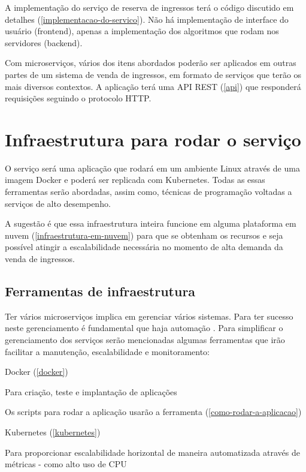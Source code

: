 A implementação do serviço de reserva de ingressos terá o código discutido
em detalhes (\autoref{implementacao-do-servico}). Não há implementação
de interface do usuário (frontend), apenas a implementação dos algoritmos
que rodam nos servidores (backend).

Com microserviços, vários dos itens abordados poderão ser aplicados em outras partes
de um sistema
de venda de ingressos, em formato de serviços que terão os mais diversos contextos.
A aplicação terá uma API REST (\autoref{api}) que responderá requisições
seguindo o protocolo HTTP.

\section{Infraestrutura para rodar o serviço}

O serviço será uma aplicação que rodará em um ambiente Linux através
de uma imagem Docker e poderá ser replicada com Kubernetes.
Todas as essas ferramentas serão abordadas, assim como, técnicas de programação
voltadas a serviços de alto desempenho.

A sugestão é que essa infraestrutura inteira funcione em alguma plataforma em nuvem
(\autoref{infraestrutura-em-nuvem}) para que se obtenham os recursos e seja possível atingir
a escalabilidade necessária no momento de alta demanda da venda de ingressos.

\subsection{Ferramentas de infraestrutura}

Ter vários microserviços implica em gerenciar
vários sistemas.
Para ter sucesso neste gerenciamento é fundamental que haja automação
\cite{martin-fowler-microservices}.
Para simplificar o gerenciamento dos serviços serão mencionadas algumas ferramentas que
irão facilitar a manutenção, escalabilidade e monitoramento:

\begin{alineas}

  \item Docker (\autoref{docker})

  \begin{alineas}
     \item Para criação, teste e implantação de aplicações \cite{aws-o-que-e-o-docker}
     \item Os scripts para rodar a aplicação usarão a ferramenta
           (\autoref{como-rodar-a-aplicacao})
  \end{alineas}

  \item Kubernetes (\autoref{kubernetes})

  \begin{alineas}
     \item Para proporcionar escalabilidade horizontal de maneira automatizada através de métricas
           - como alto uso de CPU \cite{kubernetes-horizontal-pod-autoscaling}
  \end{alineas}

\end{alineas}
